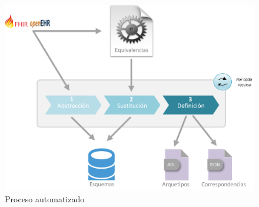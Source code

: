 \begin{figure}[t]
  \centering
  \includegraphics[scale=0.6]{./images/solution}
  \caption{Proceso automatizado}
  \label{fig:solution}
\end{figure}




